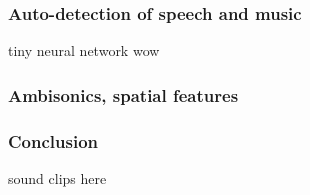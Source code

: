 \documentclass{beamer}
\begin{document}
\begin{frame}
	\frametitle{Auto-detection of speech and music}
	tiny neural network wow
\end{frame}

\begin{frame}
	\frametitle{Ambisonics, spatial features}
\end{frame}


\begin{frame}
	\frametitle{Conclusion}
	sound clips here
\end{frame}
\end{document}
